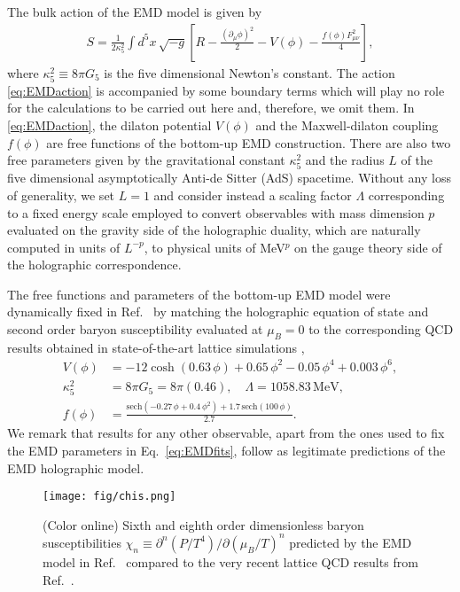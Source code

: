 \documentclass[aps,prd,showkeys,superscriptaddress,singlecolumn,nofootinbib,floatfix]{revtex4-1}
\begin{document}
The bulk action of the EMD model is given by
\begin{align}
S= \frac{1}{2\kappa_5^2}\int d^5x\,\sqrt{-g}\left[R-\frac{(\partial_\mu\phi)^2}{2}-V(\phi) -\frac{f(\phi)F_{\mu\nu}^2}{4}\right],
\label{eq:EMDaction}
\end{align}
where $\kappa_5^2\equiv 8\pi G_5$ is the five dimensional Newton's constant. The action \eqref{eq:EMDaction} is accompanied by some boundary terms which will play no role for the calculations to be carried out here and, therefore, we omit them. In \eqref{eq:EMDaction}, the dilaton potential $V(\phi)$ and the Maxwell-dilaton coupling $f(\phi)$ are free functions of the bottom-up EMD construction. There are also two free parameters given by the gravitational constant $\kappa_5^2$ and the radius $L$ of the five dimensional asymptotically Anti-de Sitter (AdS) spacetime. Without any loss of generality, we set $L=1$ and consider instead a scaling factor $\Lambda$ corresponding to a fixed energy scale employed to convert observables with mass dimension $p$ evaluated on the gravity side of the holographic duality, which are naturally computed in units of $L^{-p}$, to physical units of MeV$^p$ on the gauge theory side of the holographic correspondence.

The free functions and parameters of the bottom-up EMD model were dynamically fixed in Ref.\ \cite{Critelli:2017oub} by matching the holographic equation of state and second order baryon susceptibility evaluated at $\mu_B=0$ to the corresponding QCD results obtained in state-of-the-art lattice simulations \cite{Bellwied:2015lba,Borsanyi:2011sw,Borsanyi:2013bia},
\begin{align}
V(\phi)&=-12\cosh(0.63\,\phi)+0.65\,\phi^2-0.05\,\phi^4+0.003\,\phi^6,\nonumber\\
\kappa_5^2&=8\pi G_5=8\pi(0.46), \quad \Lambda=1058.83\,\textrm{MeV},\nonumber\\
f(\phi)&=\frac{\textrm{sech}\left(-0.27\,\phi + 0.4\,\phi^2\right) + 1.7\,\textrm{sech}(100\,\phi)}{2.7}.
\label{eq:EMDfits}
\end{align}
We remark that results for any other observable, apart from the ones used to fix the EMD parameters in Eq.\ \eqref{eq:EMDfits}, follow as legitimate predictions of the EMD holographic model.

\begin{figure*}
\begin{center}
\texttt{[image: fig/chis.png]}
\end{center}
\caption{{\small (Color online) Sixth and eighth order dimensionless baryon susceptibilities $\chi_n\equiv \partial^n(P/T^4)/\partial(\mu_B/T)^n$ predicted by the EMD model in Ref.\ \cite{Critelli:2017oub} compared to the very recent lattice QCD results from Ref.\ \cite{Borsanyi:2018grb}.}
\label{fig:thermo}}
\end{figure*}
\end{document}
